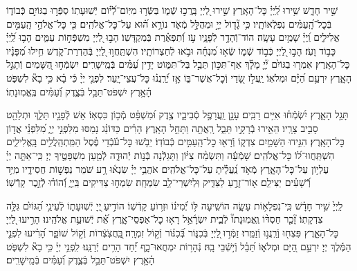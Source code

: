 \documentclass[twoside, openany, parskip=half, 11pt]{book}
\begin{document}
שִׁ֣יר חָדָ֑שׁ שִׁ֥ירוּ לַֽ֝יְיָ֗ כׇּל־הָאָֽרֶץ׃
שִׁ֣ירוּ לַ֭יְיָ בָּֽרֲכ֣וּ שְֿׁמ֑וֹ בַּשְּֿׂר֥וּ מִיּֽוֹם־לְֿ֝י֗וֹם יְֿשֽׁוּעָתֽוֹ׃
סַפְּֿר֣וּ בַגּוֹיִ֣ם כְּֿבוֹד֑וֹ בְּֿכׇל־הָֽ֝עַמִּ֗ים נִפְלְֿאוֹתָֽיו׃
כִּ֥י גָ֘ד֤וֹל יְיָ֣ וּמְהֻלָּ֣ל מְֿאֹ֑ד נוֹרָ֥א ה֝֗וּא עַל־כׇּל־אֱלֹהִֽים׃
כִּ֤י כׇּל־אֱלֹהֵ֣י הָֽעַמִּ֣ים אֱלִילִ֑ים וַֽ֝יְיָ֗ שָׁמַ֥יִם עָשָֽׂה׃
הוֹד־וְֿהָדָ֥ר לְֿפָנָ֑יו עֹ֥ז וְֿ֝תִפְאֶ֗רֶת בְּֿמִקְדָּשֽׁוֹ׃
הָב֣וּ לַ֭יְיָ מִשְׁפְּֿח֣וֹת עַמִּ֑ים הָב֥וּ לַֽ֝יְיָ֗ כָּב֥וֹד וָעֹֽז׃
הָב֣וּ לַ֭יְיָ כְּֿב֣וֹד שְֿׁמ֑וֹ שְֿׂא֥וּ מִ֝נְחָ֗ה וּבֹ֥אוּ לְֿחַצְרוֹתָֽיו׃
הִשְׁתַּֽחֲו֣וּ לַ֭יְיָ בְּֿהַדְרַת־קֹ֑דֶשׁ חִ֥ילוּ מִ֝פָּנָ֗יו כׇּל־הָאָֽרֶץ׃
אִמְר֤וּ בַגּוֹיִ֨ם יְ֘יָ֤ מָלָ֗ךְ אַף־תִּכּ֣וֹן תֵּבֵ֣ל בַּל־תִּמּ֑וֹט יָדִ֥ין עַ֝מִּ֗ים בְּֿמֵֽישָׁרִֽים׃
יִשְׂמְֿח֣וּ הַ֭שָּׁמַיִם וְֿתָגֵ֣ל הָאָ֑רֶץ יִרְעַ֥ם הַ֝יָּ֗ם וּמְלֹאֽוֹ׃
יַֽעֲלֹ֣ז שָׂ֭דַי וְֿכׇל־אֲשֶׁר־בּ֑וֹ אָ֥ז יְֿ֝רַֽנֲנ֗וּ כׇּל־עֲצֵי־יָֽעַר׃
לִפְנֵ֤י יְיָ֨ כִּ֬י בָ֗א כִּ֥י בָא֘ לִשְׁפֹּ֢ט הָ֫אָ֥רֶץ יִשְׁפֹּט־תֵּבֵ֥ל בְּֿצֶ֑דֶק וְֿ֝עַמִּ֗ים בֶּֽאֱמֽוּנָתֽוֹ׃

תָּגֵ֣ל הָאָ֑רֶץ יִ֝שְׂמְֿח֗וּ אִיִּ֥ים רַבִּֽים׃
עָנָ֣ן וַֽעֲרָפֶ֣ל סְֿבִיבָ֑יו צֶ֥דֶק וּ֝מִשְׁפָּ֗ט מְֿכ֣וֹן כִּסְאֽוֹ׃
אֵשׁ לְֿפָנָ֣יו תֵּלֵ֑ךְ וּתְלַהֵ֖ט סָבִ֣יב צָרָֽיו׃
הֵאִ֣ירוּ בְֿרָקָ֣יו תֵּבֵ֑ל רָֽאֲתָ֖ה וַתָּחֵ֣ל הָאָֽרֶץ׃
הָרִ֗ים כַּדּוֹנַ֗ג נָמַסּוּ מִלִּפְנֵ֣י יְיָ֑ מִ֝לִּפְנֵ֗י אֲד֣וֹן כׇּל־הָאָֽרֶץ׃
הִגִּ֣ידוּ הַשָּׁמַ֣יִם צִדְק֑וֹ וְֿרָא֖וּ כׇל־הָֽעַמִּ֣ים כְּֿבוֹדֽוֹ׃
יֵבֹ֤שׁוּ כׇּל־עֹ֬בְֿדֵי פֶ֗סֶל הַמִּֽתְהַֽלֲלִ֥ים בָּֽאֱלִילִ֑ים הִשְׁתַּֽחֲווּ־ל֝וֹ כׇּל־אֱלֹהִֽים׃
שָׁמְֿעָ֬ה וַתִּשְׂמַ֨ח צִיּ֗וֹן וַתָּגֵלְֿנָה בְּֿנ֣וֹת יְֿהוּדָ֑ה לְֿמַ֖עַן מִשְׁפָּטֶ֣יךָ יְיָ׃
כִּֽי־אַתָּ֤ה יְיָ֗ עֶלְי֥וֹן עַל־כׇּל־הָאָ֑רֶץ מְֿאֹ֥ד נַֽ֝עֲלֵ֗יתָ עַל־כׇּל־אֱלֹהִֽים׃
אֹהֲבֵ֥י יְיָ֗ שִׂנְא֫וּ רָ֥ע שֹׁמֵר נַפְשׁ֣וֹת חֲסִידָ֑יו מִיַּ֥ד רְֿ֝שָׁעִ֗ים יַצִּילֵֽם׃
א֖וֹר־זָרֻ֣עַ לַצַּדִּ֑יק וּֽלְיִשְׁרֵי־לֵ֥ב שִׂמְחָֽה׃
שִׂמְח֣וּ צַדִּיקִים בַּֽיְיָ֑ וְֿ֝הוֹד֗וּ לְֿזֵ֣כֶר קָדְֿשֽׁוֹ׃


לַֽיְיָ֙ שִׁ֥יר חָדָ֗שׁ כִּֽי־נִפְלָא֥וֹת עָשָׂ֑ה הוֹשִֽׁיעָה לּ֥וֹ יְֿ֝מִינ֗וֹ וּזְר֥וֹעַ קָדְֿשֽׁוֹ׃
הוֹדִ֣יעַ ֖יְיָ יְֿשֽׁוּעָת֑וֹ לְֿעֵינֵ֥י הַ֝גּוֹיִ֗ם גִּלָּ֥ה צִדְקָתֽוֹ׃
זָ֘כַ֤ר חַסְדּ֨וֹ וֶֽאֱמֽוּנָתוֹ֘ לְֿבֵ֢ית יִשְׂרָ֫אֵ֥ל רָא֥וּ כׇל־אַפְסֵי־אָ֑רֶץ אֵ֝֗ת יְֿשׁוּעַ֥ת אֱלֹהֵֽינוּ׃
הָרִ֣יעוּ לַ֭יְיָ כׇּל־הָאָ֑רֶץ פִּצְח֖וּ וְֿרַֽנֲנ֣וּ וְֿזַמֵּֽרוּ׃
זַמְּֿר֣וּ ֖לַיְיָ בְּֿכִנּ֑וֹר בְּֿ֝כִנּ֗וֹר וְֿק֣וֹל זִמְרָֽה׃
֖בַּֽחֲצֹֽצְֿרוֹת וְֿק֣וֹל שׁוֹפָ֑ר הָ֝רִ֗יעוּ לִפְנֵ֤י הַמֶּ֬לֶךְ יְיָ׃
יִרְעַ֣ם הַ֭יָּם וּמְלֹא֑וֹ תֵּ֝בֵ֗ל וְֿי֣שְֿׁבֵי בָֽהּ׃
נְֿהָר֥וֹת יִמְחֲאוּ־כָ֑ף יַ֝֗חַד הָרִ֥ים יְֿרַנֵּֽנוּ׃
לִֽפְנֵ֥י יְיָ֗ כִּ֥י בָא֘ לִשְׁפֹּ֢ט הָ֫אָ֥רֶץ יִשְׁפֹּט־תֵּבֵ֥ל בְּֿצֶ֑דֶק וְֿ֝עַמִּ֗ים בְּֿמֵֽישָׁרִֽים׃
\end{document}
